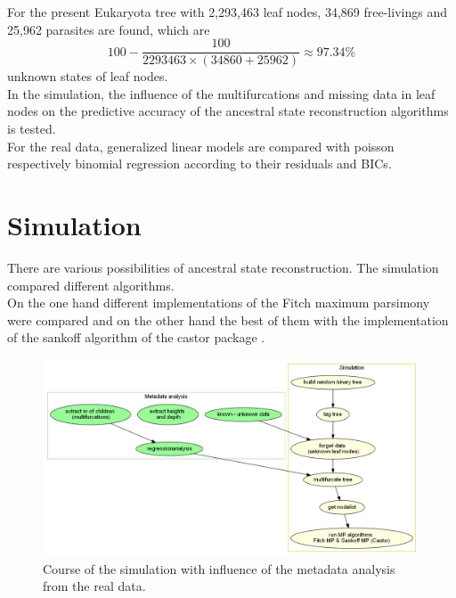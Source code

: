 
      For the present Eukaryota tree with 2,293,463 leaf nodes, 34,869 free-livings and 25,962 parasites 
        are found, which are
        $$100-\frac{100}{2293463 \times (34860+25962)} \approx 97.34 \%$$
        unknown states of leaf nodes. \\

      In the simulation, the influence of the multifurcations and missing data in leaf nodes on the 
        predictive accuracy of the ancestral state reconstruction algorithms is tested. \\
      For the real data, generalized linear models are compared with poisson respectively binomial 
        regression according to their residuals and BICs.

  \section{Simulation}\label{sec:simulation}
    There are various possibilities of ancestral state reconstruction. The simulation compared 
      different algorithms. \\
    On the one hand different implementations of the Fitch maximum parsimony were compared and on the 
      other hand the best of them with the implementation of the sankoff algorithm of the castor 
      package \cite{Louca2017}. \\

    \begin{figure}[h!]
      \centering
      \includegraphics[width=1\textwidth]{Figures/Workflow-Simulation.png}
      \caption{Course of the simulation with influence of the metadata analysis from the real data.}
      \label{fig:Simulation Workflow}
    \end{figure}

